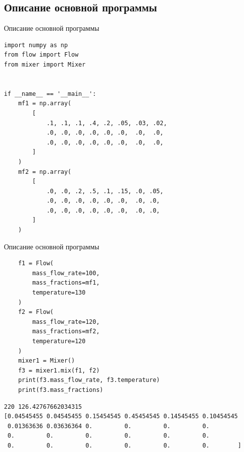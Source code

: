 \documentclass[aspectratio=169, mathserif]{beamer}	%
\begin{document}
\subsection{Описание основной программы}
\begin{frame}[fragile]{Описание основной программы}
\scriptsize
\begin{verbatim}
import numpy as np
from flow import Flow
from mixer import Mixer


if __name__ == '__main__':
    mf1 = np.array(
        [
            .1, .1, .1, .4, .2, .05, .03, .02,
            .0, .0, .0, .0, .0, .0,  .0,  .0,
            .0, .0, .0, .0, .0, .0,  .0,  .0,
        ]
    )
    mf2 = np.array(
        [
            .0, .0, .2, .5, .1, .15, .0, .05,
            .0, .0, .0, .0, .0, .0,  .0, .0,
            .0, .0, .0, .0, .0, .0,  .0, .0,
        ]
    )
\end{verbatim}
\vfill
\end{frame}


\begin{frame}[fragile]{Описание основной программы}
\scriptsize
\begin{verbatim}
    f1 = Flow(
        mass_flow_rate=100,
        mass_fractions=mf1,
        temperature=130
    )
    f2 = Flow(
        mass_flow_rate=120,
        mass_fractions=mf2,
        temperature=120
    )
    mixer1 = Mixer()
    f3 = mixer1.mix(f1, f2)
    print(f3.mass_flow_rate, f3.temperature)
    print(f3.mass_fractions)
\end{verbatim}
\vfill
\begin{verbatim}
220 126.42767662034315
[0.04545455 0.04545455 0.15454545 0.45454545 0.14545455 0.10454545
 0.01363636 0.03636364 0.         0.         0.         0.
 0.         0.         0.         0.         0.         0.
 0.         0.         0.         0.         0.         0.        ]
\end{verbatim}
\vfill
\end{frame}


\end{document}
